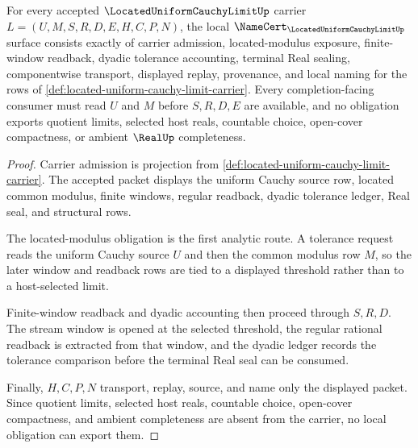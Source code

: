 \begin{theorem}
\label{thm:located-uniform-cauchy-limit-namecert-obligations}
For every accepted $\LocatedUniformCauchyLimitUp$ carrier $L=(U,M,S,R,D,E,H,C,P,N)$, the local $\NameCert_{\LocatedUniformCauchyLimitUp}$ surface consists exactly of carrier admission, located-modulus exposure, finite-window readback, dyadic tolerance accounting, terminal Real sealing, componentwise transport, displayed replay, provenance, and local naming for the rows of \autoref{def:located-uniform-cauchy-limit-carrier}. Every completion-facing consumer must read $U$ and $M$ before $S,R,D,E$ are available, and no obligation exports quotient limits, selected host reals, countable choice, open-cover compactness, or ambient $\RealUp$ completeness.
\end{theorem}
\begin{proof}
Carrier admission is projection from \autoref{def:located-uniform-cauchy-limit-carrier}. The accepted packet displays the uniform Cauchy source row, located common modulus, finite windows, regular readback, dyadic tolerance ledger, Real seal, and structural rows.

The located-modulus obligation is the first analytic route. A tolerance request reads the uniform Cauchy source $U$ and then the common modulus row $M$, so the later window and readback rows are tied to a displayed threshold rather than to a host-selected limit.

Finite-window readback and dyadic accounting then proceed through $S,R,D$. The stream window is opened at the selected threshold, the regular rational readback is extracted from that window, and the dyadic ledger records the tolerance comparison before the terminal Real seal can be consumed.

Finally, $H,C,P,N$ transport, replay, source, and name only the displayed packet. Since quotient limits, selected host reals, countable choice, open-cover compactness, and ambient completeness are absent from the carrier, no local obligation can export them.
\end{proof}

